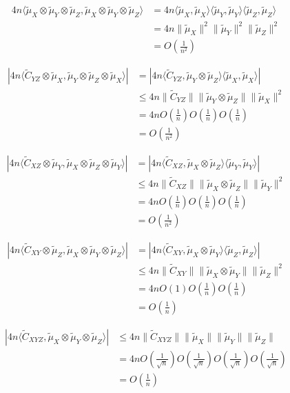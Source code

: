 \documentclass{article}
\begin{document}
\begin{align*}
4n\langle \tilde{\mu}_X \otimes\tilde{\mu}_Y \otimes \tilde{\mu}_Z,\tilde{\mu}_X \otimes\tilde{\mu}_Y \otimes \tilde{\mu}_Z \rangle &=
4n\langle \tilde{\mu}_X,\tilde{\mu}_X\rangle\langle \tilde{\mu}_Y, \tilde{\mu}_Y \rangle\langle \tilde{\mu}_Z,\tilde{\mu}_Z \rangle\\ &=
4n\|\tilde{\mu}_X\|^2\|\tilde{\mu}_Y\|^2\|\tilde{\mu}_Z\|^2 \\&=
O(\frac{1}{n^2})
\end{align*}


\begin{align*}
|4n\langle \tilde{C}_{YZ}\otimes \tilde{\mu}_X,\tilde{\mu}_Y \otimes\tilde{\mu}_Z \otimes \tilde{\mu}_X \rangle| &= |4n\langle \tilde{C}_{YZ},\tilde{\mu}_Y \otimes\tilde{\mu}_Z \rangle \langle \tilde{\mu}_X, \tilde{\mu}_X \rangle|\\ &\leq
4n\|\tilde{C}_{YZ}\|\|\tilde{\mu}_Y \otimes\tilde{\mu}_Z\|\|\tilde{\mu}_X\|^2 \\&=
4n O(\frac{1}{n}) O(\frac{1}{n}) O(\frac{1}{n}) \\&= O(\frac{1}{n^2})
\end{align*}

\begin{align*}
|4n\langle \tilde{C}_{XZ}\otimes \tilde{\mu}_Y,\tilde{\mu}_X \otimes\tilde{\mu}_Z \otimes \tilde{\mu}_Y \rangle| &= |4n\langle \tilde{C}_{XZ},\tilde{\mu}_X \otimes\tilde{\mu}_Z \rangle \langle \tilde{\mu}_Y, \tilde{\mu}_Y \rangle|\\ &\leq
4n\|\tilde{C}_{XZ}\|\|\tilde{\mu}_X \otimes\tilde{\mu}_Z\|\|\tilde{\mu}_Y\|^2 \\&=
4n O(\frac{1}{n}) O(\frac{1}{n}) O(\frac{1}{n}) \\&= O(\frac{1}{n^2})
\end{align*}

\begin{align*}
|4n\langle \tilde{C}_{XY}\otimes \tilde{\mu}_Z,\tilde{\mu}_X \otimes\tilde{\mu}_Y \otimes \tilde{\mu}_Z \rangle| &= |4n\langle \tilde{C}_{XY},\tilde{\mu}_X \otimes\tilde{\mu}_Y \rangle \langle \tilde{\mu}_Z, \tilde{\mu}_Z \rangle|\\ &\leq
4n\|\tilde{C}_{XY}\|\|\tilde{\mu}_X \otimes\tilde{\mu}_Y\|\|\tilde{\mu}_Z\|^2 \\&=
4n O(1) O(\frac{1}{n}) O(\frac{1}{n}) \\&= O(\frac{1}{n})
\end{align*}


\begin{align*}
|4n\langle \tilde{C}_{XYZ},\tilde{\mu}_X \otimes\tilde{\mu}_Y \otimes \tilde{\mu}_Z \rangle| &\leq 4n\|\tilde{C}_{XYZ}\|\|\tilde{\mu}_X\|\|\tilde{\mu}_Y\|\|\tilde{\mu}_Z\|\\ &=
4n O(\frac{1}{\sqrt{n}}) O(\frac{1}{\sqrt{n}}) O(\frac{1}{\sqrt{n}}) O(\frac{1}{\sqrt{n}}) \\& = O(\frac{1}{n})
\end{align*}
\end{document}
